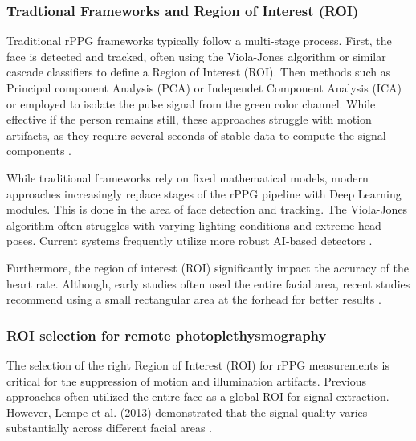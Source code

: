 \subsubsection{Tradtional Frameworks and Region of Interest (ROI)}

Traditional rPPG frameworks typically follow a multi-stage process. First, the face is detected and tracked, often using the Viola-Jones algorithm or similar cascade classifiers to define a Region of Interest (ROI). Then methods such as Principal component Analysis (PCA) or Independet Component Analysis (ICA) or employed to isolate the pulse signal from the green color channel. While effective if the person remains still, these approaches struggle with motion artifacts, as they require several seconds of stable data to compute the signal components \cite{Debnath25}.

While traditional frameworks rely on fixed mathematical models, modern approaches increasingly replace stages of the rPPG pipeline with Deep Learning modules. This is done in the area of face detection and tracking. The Viola-Jones algorithm often struggles with varying lighting conditions and extreme head poses. Current systems frequently utilize more robust AI-based detectors \cite{Debnath25}.

Furthermore, the region of interest (ROI) significantly impact the accuracy of the heart rate. Although, early studies often used the entire facial area, recent studies recommend using a small rectangular area at the forhead for better results \cite{Debnath25}.


\subsubsection{ROI selection for remote photoplethysmography}


The selection of the right Region of Interest (ROI) for rPPG measurements is critical for the suppression of motion and illumination artifacts. Previous approaches often utilized the entire face as a global ROI for signal extraction. However, Lempe et al. (2013) demonstrated that the signal quality varies substantially across different facial areas \cite{lempe2013roi}.


